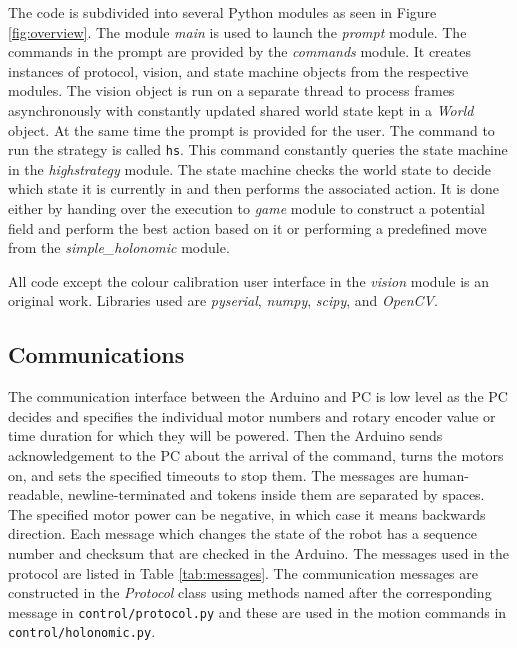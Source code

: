 \documentclass[a4paper,12pt]{article}
\begin{document}
The code is subdivided into several Python modules as seen in Figure \ref{fig:overview}. The module \textit{main} is used to launch the \textit{prompt} module. The commands in the prompt are provided by the \textit{commands} module. It creates instances of protocol, vision, and state machine objects from the respective modules. The vision object is run on a separate thread to process frames asynchronously with constantly updated shared world state kept in a \textit{World} object. At the same time the prompt is provided for the user. The command to run the strategy is called \texttt{hs}. This command constantly queries the state machine in the \textit{highstrategy} module. The state machine checks the world state to decide which state it is currently in and then performs the associated action. It is done either by handing over the execution to \textit{game} module to construct a potential field and perform the best action based on it or performing a predefined move from the \textit{simple\_holonomic} module.

All code except the colour calibration user interface in the \textit{vision} module is an original work. Libraries used are \textit{pyserial}, \textit{numpy}, \textit{scipy}, and \textit{OpenCV}.

\subsection{Communications}

The communication interface between the Arduino and PC is low level as the PC decides and specifies the individual motor numbers and rotary encoder value or time duration for which they will be powered. Then the Arduino sends acknowledgement to the PC about the arrival of the command, turns the motors on, and sets the specified timeouts to stop them. The messages are human-readable, newline-terminated and tokens inside them are separated by spaces. The specified motor power can be negative, in which case it means backwards direction. Each message which changes the state of the robot has a sequence number and checksum that are checked in the Arduino. The messages used in the protocol are listed in Table \ref{tab:messages}. The communication messages are constructed in the \textit{Protocol} class using methods named after the corresponding message in \texttt{control/protocol.py} and these are used in the motion commands in \texttt{control/holonomic.py}.
\end{document}

